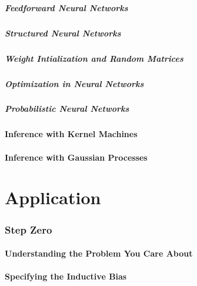 \documentclass[10pt]{article}
\begin{document}
\subsubsection{Feedforward Neural Networks}

\subsubsection{Structured Neural Networks}

\subsubsection{Weight Intialization and Random Matrices}

\subsubsection{Optimization in Neural Networks}

\subsubsection{Probabilistic Neural Networks}

\subsection{Inference with Kernel Machines}

\subsection{Inference with Gaussian Processes}

\newpage

\part{Application}

\section{Step Zero}

\subsection{Understanding the Problem You Care About}

\subsection{Specifying the Inductive Bias}
\end{document}
